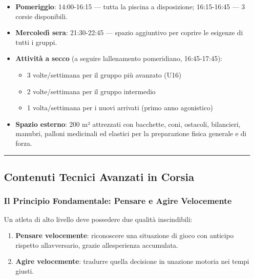 \documentclass[a4paper,11pt]{article}
\providecommand{\tightlist}{%
  \setlength{\itemsep}{0pt}\setlength{\parskip}{0pt}}
\begin{document}
\begin{itemize}
      \tightlist
      \item
            \textbf{Pomeriggio}: 14:00-16:15 --- tutta la piscina a disposizione;
            16:15-16:45 --- 3 corsie disponibili.
      \item
            \textbf{Mercoledì sera}: 21:30-22:45 --- spazio aggiuntivo per coprire
            le esigenze di tutti i gruppi.
      \item
            \textbf{Attività a secco} (a seguire l\textquotesingle allenamento
            pomeridiano, 16:45-17:45):

            \begin{itemize}
                  \tightlist
                  \item
                        3 volte/settimana per il gruppo più avanzato (U16)
                  \item
                        2 volte/settimana per il gruppo intermedio
                  \item
                        1 volta/settimana per i nuovi arrivati (primo anno agonistico)
            \end{itemize}
      \item
            \textbf{Spazio esterno}: 200 m² attrezzati con bacchette, coni,
            ostacoli, bilancieri, manubri, palloni medicinali ed elastici per la
            preparazione fisica generale e di forza.
\end{itemize}

\begin{center}\rule{0.5\linewidth}{0.5pt}\end{center}

\subsection{Contenuti Tecnici Avanzati in
      Corsia}\label{contenuti-tecnici-avanzati-in-corsia}

\subsubsection{Il Principio Fondamentale: Pensare e Agire
      Velocemente}\label{il-principio-fondamentale-pensare-e-agire-velocemente}

Un atleta di alto livello deve possedere due qualità inscindibili:

\begin{enumerate}
      \tightlist
      \item
            \textbf{Pensare velocemente}: riconoscere una situazione di gioco con
            anticipo rispetto all\textquotesingle avversario, grazie
            all\textquotesingle esperienza accumulata.
      \item
            \textbf{Agire velocemente}: tradurre quella decisione in
            un\textquotesingle azione motoria nei tempi giusti.
\end{enumerate}
\end{document}
